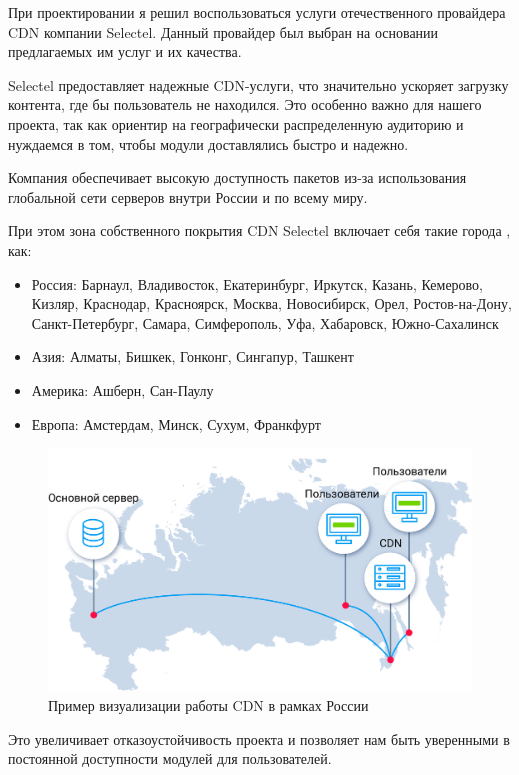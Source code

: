  При проектировании я решил воспользоваться услуги отечественного провайдера CDN компании Selectel. \cite{cdn:selectel} Данный провайдер был выбран на основании предлагаемых им услуг и их качества.

Selectel предоставляет надежные CDN-услуги, что значительно ускоряет загрузку контента, где бы пользователь не находился. Это особенно важно для нашего проекта, так как ориентир на географически распределенную аудиторию и нуждаемся в том, чтобы модули доставлялись быстро и надежно.

Компания обеспечивает высокую доступность пакетов из-за использования глобальной сети серверов внутри России и по всему миру.

При этом зона собственного покрытия CDN Selectel включает себя такие города \cite{cdn:selectel}, как:
\begin{itemize}
    \item Россия: Барнаул, Владивосток, Екатеринбург, Иркутск, Казань, Кемерово, Кизляр, Краснодар, Красноярск, Москва, Новосибирск, Орел, Ростов-на-Дону, Санкт-Петербург, Самара, Симферополь, Уфа, Хабаровск, Южно-Сахалинск
    \item Азия: Алматы, Бишкек, Гонконг, Сингапур, Ташкент
    \item Америка: Ашберн, Сан-Паулу
    \item Европа: Амстердам, Минск, Сухум, Франкфурт
\end{itemize}

\begin{figure}
  \centering
  \includegraphics[width=.8\textwidth]{graphics/img/cdn.scheme.5Y4Ydf}
  \caption{Пример визуализации работы CDN в рамках России}
  \label{fig:cdn_russia}
\end{figure}

Это увеличивает отказоустойчивость проекта и позволяет нам быть уверенными в постоянной доступности модулей для пользователей.

